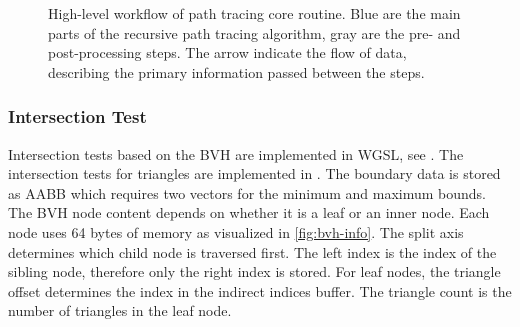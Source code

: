 \begin{figure}[H]
    \centering
    \caption{High-level workflow of path tracing core routine. Blue are the main parts of the recursive path tracing algorithm, gray are the pre- and post-processing steps. The arrow indicate the flow of data, describing the primary information passed between the steps.}
    \label{fig:path-tracer-workflow}
  \end{figure}

\subsubsection{Intersection Test}
\label{sec:bvh-implementation}

Intersection tests based on the \gls{BVH} are implemented in \gls{WGSL}, see . The intersection tests for triangles are implemented in . The boundary data is stored as \gls{AABB} which requires two vectors for the minimum and maximum bounds. The \gls{BVH} node content depends on whether it is a leaf or an inner node. Each node uses 64 bytes of memory as visualized in \autoref{fig:bvh-info}. The split axis determines which child node is traversed first. The left index is the index of the sibling node, therefore only the right index is stored. For leaf nodes, the triangle offset determines the index in the indirect indices buffer. The triangle count is the number of triangles in the leaf node.

